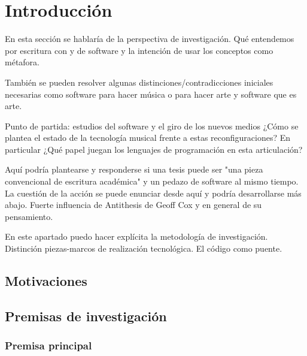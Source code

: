 \chapter{Introducción}

En esta sección se hablaría de la perspectiva de investigación. Qué entendemos por escritura con y de software y la intención de usar los conceptos como métafora.

También se pueden resolver algunas distinciones/contradicciones iniciales necesarias como software para hacer música o para hacer arte y software que es arte. %

Punto de partida: estudios del software y el giro de los nuevos medios
¿Cómo se plantea el estado de la tecnología musical frente a estas reconfiguraciones? En particular ¿Qué papel juegan los lenguajes de programación en esta articulación? 

Aquí podría plantearse y responderse si una tesis puede ser "una pieza convencional de escritura académica" y un pedazo de software al mismo tiempo. 
La cuestión de la acción se puede enunciar desde aquí y podría desarrollarse más abajo. Fuerte influencia de Antithesis de Geoff Cox y en general de su pensamiento.

En este apartado puedo hacer explícita la metodología de investigación. 
Distinción piezas-marcos de realización tecnológica. El código como puente. 

\section{Motivaciones}

\section{Premisas de investigación}


\subsection{Premisa principal}

